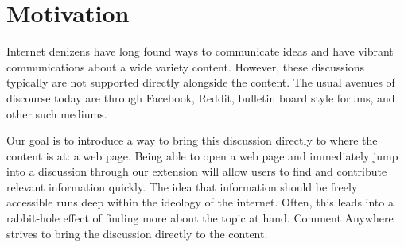 \documentclass[proposal.tex]{subfiles}
\begin{document}
    
\section{Motivation}

Internet denizens have long found ways to communicate ideas and have vibrant communications about a wide variety content.
However, these discussions typically are not supported directly alongside the content.
The usual avenues of discourse today are through Facebook, Reddit, bulletin board style forums, and other such mediums.

Our goal is to introduce a way to bring this discussion directly to where the content is at: a web page.
Being able to open a web page and immediately jump into a discussion through our extension will allow users to find and contribute relevant information quickly.
The idea that information should be freely accessible runs deep within the ideology of the internet.
Often, this leads into a rabbit-hole effect of finding more about the topic at hand.
Comment Anywhere strives to bring the discussion directly to the content.
\end{document}
